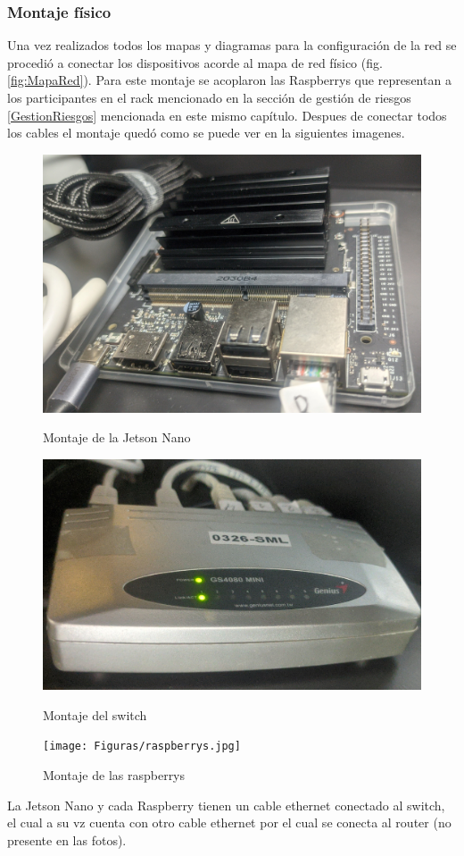 \subsubsection{Montaje físico}
Una vez realizados todos los mapas y diagramas para la configuración de la red se procedió a conectar los dispositivos acorde al mapa de red físico (fig. \ref{fig:MapaRed}). Para este montaje se acoplaron las Raspberrys que representan a los participantes en el rack mencionado en la sección de gestión de riesgos \ref{GestionRiesgos} mencionada en este mismo capítulo. Despues de conectar todos los cables el montaje quedó como se puede ver en la siguientes imagenes.
\begin{figure}[H]
    \centering
    \begin{minipage}[t]{0.49\linewidth}  %
        \includegraphics[height=0.2\textheight]{Figuras/jetsonnano.jpg}
        \caption{Montaje de la Jetson Nano} 
    \end{minipage}
    \hfill
    \begin{minipage}[t]{0.5\linewidth}  %
        \includegraphics[height=0.2\textheight]{Figuras/switch.jpg}
        \caption{Montaje del switch} 
    \end{minipage}

    \texttt{[image: Figuras/raspberrys.jpg]}
    \caption{Montaje de las raspberrys}     
\end{figure}

La Jetson Nano y cada Raspberry tienen un cable ethernet conectado al switch, el cual a su vz cuenta con otro cable ethernet por el cual se conecta al router (no presente en las fotos).
